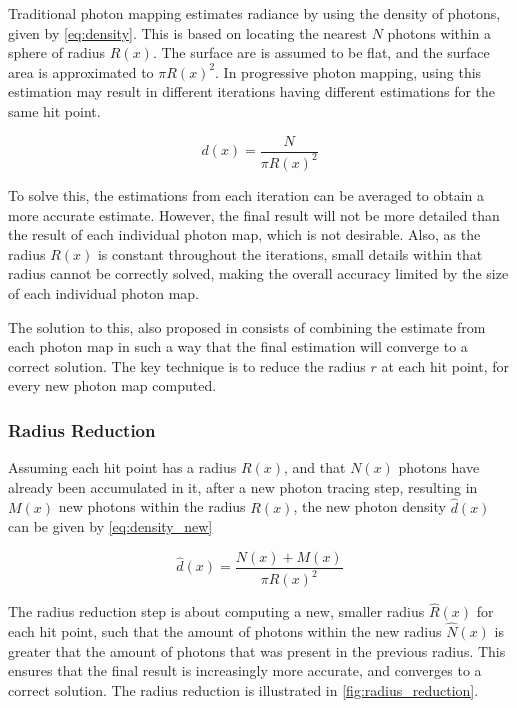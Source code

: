 \documentclass[main.tex]{subfiles}
\begin{document}
Traditional photon mapping estimates radiance by using the density of photons, given by \cref{eq:density}. This is based on locating the nearest $N$ photons within a sphere of radius $R(x)$. The surface are is assumed to be flat, and the surface area is approximated to $\pi R(x)^{2}$. In progressive photon mapping, using this estimation may result in different iterations having different estimations for the same hit point.

\begin{figure}[!htp]
  \begin{equation}
    d(x) = \frac{N}{\pi R(x)^{2}}
  \label{eq:density}
  \end{equation}
\end{figure}

To solve this, the estimations from each iteration can be averaged to obtain a more accurate estimate. However, the final result will not be more detailed than the result of each individual photon map, which is not desirable. Also, as the radius $R(x)$ is constant throughout the iterations, small details within that radius cannot be correctly solved, making the overall accuracy limited by the size of each individual photon map.

The solution to this, also proposed in \cite{hachisuka2008progressive} consists of combining the estimate from each photon map in such a way that the final estimation will converge to a correct solution. The key technique is to reduce the radius $r$ at each hit point, for every new photon map computed.

\subsubsection{Radius Reduction}

Assuming each hit point has a radius $R(x)$, and that $N(x)$ photons have already been accumulated in it, after a new photon tracing step, resulting in $M(x)$ new photons within the radius $R(x)$, the new photon density $\hat{d}(x)$ can be given by \cref{eq:density_new}

\begin{figure}[!htp]
  \begin{equation}
    \hat{d}(x) = \frac{N(x) + M(x)}{\pi R(x)^{2}}
  \label{eq:density_new}
  \end{equation}
\end{figure}

The radius reduction step is about computing a new, smaller radius $\hat{R}(x)$ for each hit point, such that the amount of photons within the new radius $\hat{N}(x)$ is greater that the amount of photons that was present in the previous radius. This ensures that the final result is increasingly more accurate, and converges to a correct solution. The radius reduction is illustrated in \cref{fig:radius_reduction}.
\end{document}
